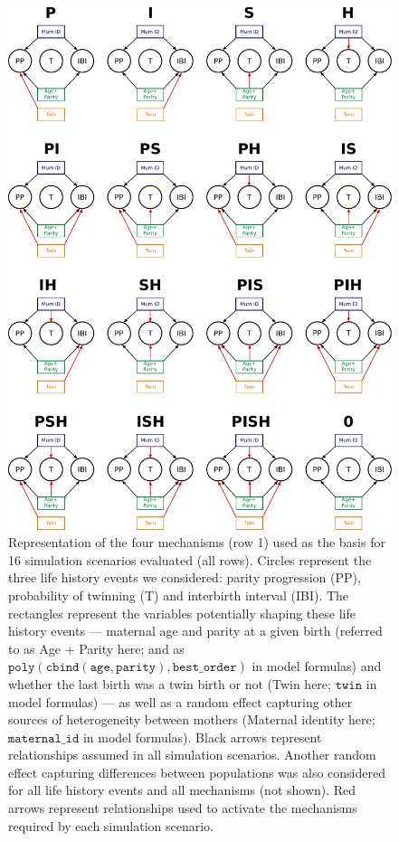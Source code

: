 \documentclass[a4paper]{article}\usepackage[]{graphicx}\usepackage[]{color}
\begin{document}
\begin{figure}[H]
\begin{center}
\includegraphics[width = 0.9\linewidth]{../figures/figS4.pdf}
\end{center}
\caption{Representation of the four mechanisms (row 1) used as the basis for 16 simulation scenarios evaluated (all rows). Circles represent the three life history events we considered: parity progression (PP), probability of twinning (T) and interbirth interval (IBI). The rectangles represent the variables potentially shaping these life history events — maternal age and parity at a given birth (referred to as Age + Parity here; and as $\mathtt{poly(cbind(age, parity), best\_order)}$ in model formulas) and whether the last birth was a twin birth or not (Twin here; $\mathtt{twin}$ in model formulas) — as well as a random effect capturing other sources of heterogeneity between mothers (Maternal identity here; $\mathtt{maternal\_id}$ in model formulas). Black arrows represent relationships assumed in all simulation scenarios. Another random effect capturing differences between populations was also considered for all life history events and all mechanisms (not shown). Red arrows represent relationships used to activate the mechanisms required by each simulation scenario.}
\end{figure}
\end{document}
